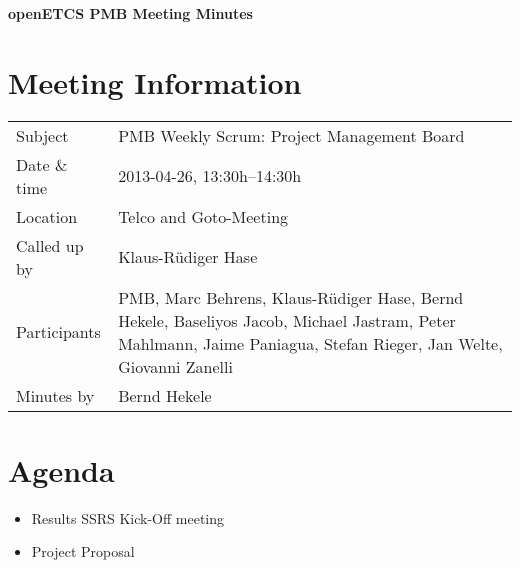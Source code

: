 \documentclass[a4paper, 11pt]{article}
\begin{document}
{\begin{center}\huge\bf openETCS PMB Meeting Minutes\end{center}}
\section{Meeting Information}

\renewcommand{\arraystretch}{1.5}
\begin{supertabular}{m{.2\textwidth}m{.8\textwidth}}
Subject & PMB Weekly Scrum: Project Management Board\\
Date \& time & 2013-04-26, 13:30h--14:30h\\
Location & Telco and Goto-Meeting\\
Called up by & Klaus-R\"udiger Hase\\
Participants & PMB,
Marc Behrens,
Klaus-R\"udiger Hase,
Bernd Hekele,
Baseliyos Jacob,
Michael Jastram, 
Peter Mahlmann, 
Jaime Paniagua,
Stefan Rieger,
Jan Welte,
Giovanni Zanelli\\

Minutes by & Bernd Hekele\\

\end{supertabular}
\renewcommand{\arraystretch}{1.0}


\section{{Agenda}}
\begin{itemize}
\item Results SSRS Kick-Off meeting
\item Project Proposal
\end{itemize}
\end{document}
